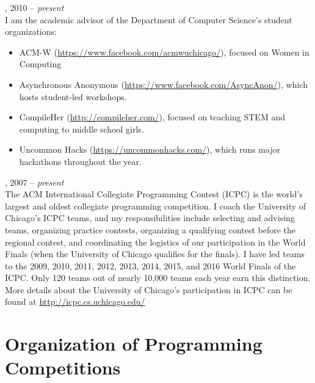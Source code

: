 \documentclass{resume}
\begin{document}
\begin{category}{}
, 2010 -- \emph{present}\\
I am the academic advisor of the Department of Computer Science's student organizations:
\begin{itemize}
\item ACM-W (\url{https://www.facebook.com/acmwuchicago/}), focused on Women in Computing
\item Asynchronous Anonymous (\url{https://www.facebook.com/AsyncAnon/}), which hosts student-led workshops.
\item CompileHer (\url{http://compileher.com/}), focused on teaching STEM and computing to middle school girls.
\item Uncommon Hacks (\url{https://uncommonhacks.com/}), which runs major hackathons throughout the year.
\end{itemize}
, 2007 -- \emph{present}\\
The ACM International Collegiate Programming Contest (ICPC) is the world's largest and oldest collegiate programming competition. I coach the University of Chicago's ICPC teams, and my responsibilities include selecting and advising teams, organizing practice contests, organizing a qualifying contest before the regional contest, and coordinating the logistics of our participation in the World Finals (when the University of Chicago qualifies for the finals). I have led teams to the 2009, 2010, 2011, 2012, 2013, 2014, 2015, and 2016 World Finals of the ICPC. Only 120 teams out of nearly 10,000 teams each year earn this distinction. More details about the University of Chicago's participation in ICPC can be found at \url{http://icpc.cs.uchicago.edu/}
\end{category}


\section*{\hspace{-1cm}Organization of Programming Competitions}
\end{document}
